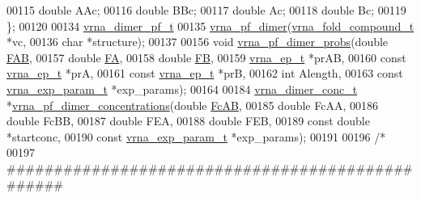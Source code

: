 \begin{DoxyCode}
00115   \textcolor{keywordtype}{double} AAc;
00116   \textcolor{keywordtype}{double} BBc;
00117   \textcolor{keywordtype}{double} Ac;
00118   \textcolor{keywordtype}{double} Bc;
00119 \};
00120 
00134 \hyperlink{group__pf__cofold_structvrna__dimer__pf__s}{vrna\_dimer\_pf\_t}
00135 \hyperlink{group__pf__cofold_ga4e5c7d06c302a7c59fc0d64dc142ca63}{vrna\_pf\_dimer}(\hyperlink{group__fold__compound_structvrna__fc__s}{vrna\_fold\_compound\_t} *vc,
00136               \textcolor{keywordtype}{char} *structure);
00137 
00156 \textcolor{keywordtype}{void}  \hyperlink{group__pf__cofold_gaa1e39e73afb51fbaf4ae38f0c066c46b}{vrna\_pf\_dimer\_probs}(\textcolor{keywordtype}{double} \hyperlink{group__pf__cofold_a01a87f59db2b7fbf883b056e6f6c673a}{FAB},
00157                           \textcolor{keywordtype}{double} \hyperlink{group__pf__cofold_a1aca57247f2c023d08028b1919005b0a}{FA},
00158                           \textcolor{keywordtype}{double} \hyperlink{group__pf__cofold_ab4d307be5400604d3c1d84d58a9981df}{FB},
00159                           \hyperlink{group__struct__utils_structvrna__elem__prob__s}{vrna\_ep\_t} *prAB,
00160                           \textcolor{keyword}{const} \hyperlink{group__struct__utils_structvrna__elem__prob__s}{vrna\_ep\_t} *prA,
00161                           \textcolor{keyword}{const} \hyperlink{group__struct__utils_structvrna__elem__prob__s}{vrna\_ep\_t} *prB,
00162                           \textcolor{keywordtype}{int} Alength,
00163                           \textcolor{keyword}{const} \hyperlink{group__energy__parameters_structvrna__exp__param__s}{vrna\_exp\_param\_t} *exp\_params);
00164 
00184 \hyperlink{group__pf__cofold_structvrna__dimer__conc__s}{vrna\_dimer\_conc\_t} *\hyperlink{group__pf__cofold_ga83b8d5d0f7875d6d5013b208f23e3356}{vrna\_pf\_dimer\_concentrations}(\textcolor{keywordtype}{double} 
      \hyperlink{group__pf__cofold_a7b01cea5721f61badebc29cf0a9c4266}{FcAB},
00185                                       \textcolor{keywordtype}{double} FcAA,
00186                                       \textcolor{keywordtype}{double} FcBB,
00187                                       \textcolor{keywordtype}{double} FEA,
00188                                       \textcolor{keywordtype}{double} FEB,
00189                                       \textcolor{keyword}{const} \textcolor{keywordtype}{double} *startconc,
00190                                       \textcolor{keyword}{const} \hyperlink{group__energy__parameters_structvrna__exp__param__s}{vrna\_exp\_param\_t} *exp\_params);
00191 
00196 \textcolor{comment}{/*}
00197 \textcolor{comment}{#################################################}

\end{DoxyCode}
